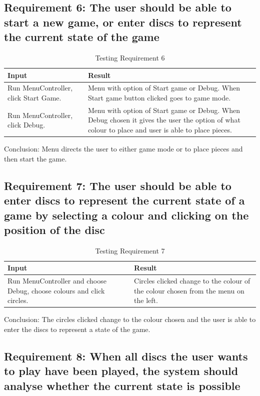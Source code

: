 \documentclass{article}
\begin{document}
{\subsection{Requirement 6: The user should be able to start a new game, or enter discs to represent the current state of the game}

\begin{table} [h]
	\centering
	\caption{Testing Requirement 6}
    \begin{tabular}{|p{6cm}|p{6cm}|}
        \hline
       	\textbf{Input} & \textbf{Result} \\ \hline
       Run MenuController, click Start Game. & Menu with option of Start game or Debug. When Start game button clicked goes to game mode. \\ \hline
      Run MenuController, click Debug. & Menu with option of Start game or Debug. When Debug chosen it gives the user the option of what  colour to place and user is able to place pieces. \\
        \hline
    \end{tabular}
\end{table}

Conclusion: Menu directs the user to either game mode or to place pieces and then start the game.

\newpage
\subsection{Requirement 7: The user should be able to enter discs to represent the current state of a game by selecting a colour and clicking on the position of the disc}

\begin{table} [h]
	\centering
	\caption{Testing Requirement 7}
    \begin{tabular}{|p{6cm}|p{6cm}|}
        \hline
       	\textbf{Input} & \textbf{Result} \\ \hline
       Run MenuController and choose Debug, choose colours and click circles. & Circles clicked change to the colour of the colour chosen from the menu on the left. \\
        \hline
    \end{tabular}
\end{table}

Conclusion: The circles clicked change to the colour chosen and the user is able to enter the discs to represent a state of the game.


\subsection{Requirement 8: When all discs the user wants to play have been played, the system should analyse whether the current state is possible}

}
\end{document}

